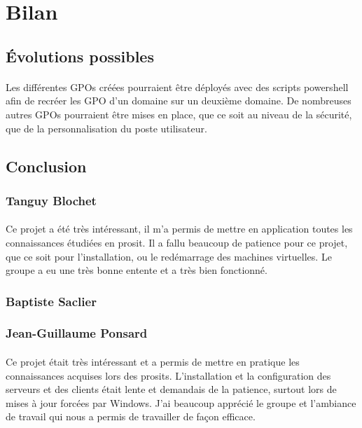 \section{Bilan}
	\subsection{Évolutions possibles}
		\paragraph{}
			Les différentes GPOs créées pourraient être déployés avec des scripts powershell afin de recréer les GPO d'un domaine sur un deuxième domaine. De nombreuses autres GPOs pourraient être mises en place, que ce soit au niveau de la sécurité, que de la personnalisation du poste utilisateur.
	\subsection{Conclusion}
		\subsubsection{Tanguy Blochet}
			\paragraph{}
				Ce projet a été très intéressant, il m'a permis de mettre en application toutes les connaissances étudiées en prosit. Il a fallu beaucoup de patience pour ce projet, que ce soit pour l'installation, ou le redémarrage des machines virtuelles. Le groupe a eu une très bonne entente et a très bien fonctionné.
		\subsubsection{Baptiste Saclier}
			\paragraph{}

		\subsubsection{Jean-Guillaume Ponsard}	
			\paragraph{}
				Ce projet était très intéressant et a permis de mettre en pratique les connaissances acquises lors des prosits. L'installation et la configuration des serveurs et des clients était lente et demandais de la patience, surtout lors de mises à jour forcées par Windows. J'ai beaucoup apprécié le groupe et l'ambiance de travail qui nous a permis de travailler de façon efficace.